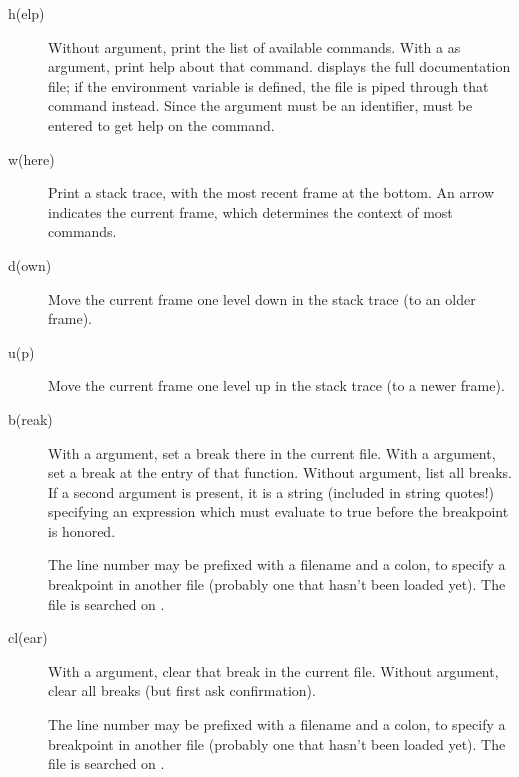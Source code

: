\begin{description}

\item[h(elp) ]

Without argument, print the list of available commands.  With a
 as argument, print help about that command.   displays the full documentation file; if the environment variable
 is defined, the file is piped through that command
instead.  Since the  argument must be an identifier,
 must be entered to get help on the \samp{!} command.

\item[w(here)]

Print a stack trace, with the most recent frame at the bottom.  An
arrow indicates the current frame, which determines the context of
most commands.

\item[d(own)]

Move the current frame one level down in the stack trace
(to an older frame).

\item[u(p)]

Move the current frame one level up in the stack trace
(to a newer frame).

\item[b(reak) ]

With a  argument, set a break there in the current
file.  With a  argument, set a break at the entry of
that function.  Without argument, list all breaks.
If a second argument is present, it is a string (included in string
quotes!) specifying an expression which must evaluate to true before
the breakpoint is honored.

The line number may be prefixed with a filename and a colon,
to specify a breakpoint in another file (probably one that
hasn't been loaded yet).  The file is searched on .

\item[cl(ear) ]

With a  argument, clear that break in the current file.
Without argument, clear all breaks (but first ask confirmation).

The line number may be prefixed with a filename and a colon,
to specify a breakpoint in another file (probably one that
hasn't been loaded yet).  The file is searched on .


\end{description}
